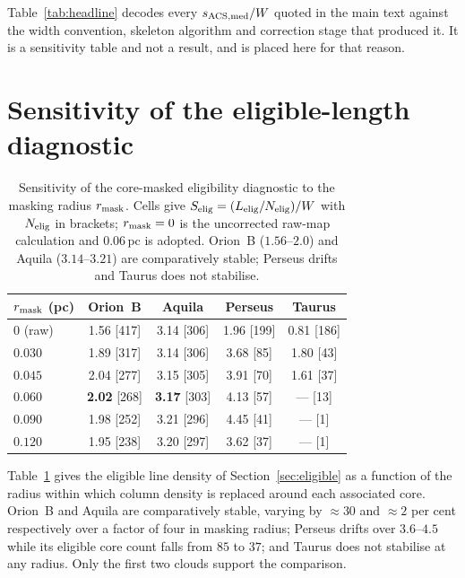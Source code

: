 \documentclass[usenatbib,twoside,twocolumn]{mnras}
\begin{document}
Table~\ref{tab:headline} decodes every $s_{\rm ACS,med}/W$ quoted in the main text against the width convention, skeleton algorithm and correction stage that produced it. It is a sensitivity table  and not a result, and is placed here for that reason.

\section{Sensitivity of the eligible-length diagnostic}
\label{sec:maskapp}

\begin{table}
\caption{Sensitivity of the core-masked eligibility diagnostic to the masking radius $r_{\rm mask}$. Cells give $S_{\rm elig}=(L_{\rm elig}/N_{\rm elig})/W$ with $N_{\rm elig}$ in brackets; $r_{\rm mask}=0$ is the uncorrected raw-map calculation and $0.06$\,pc is adopted. Orion~B ($1.56$--$2.0$) and Aquila ($3.14$--$3.21$) are comparatively stable; Perseus drifts and Taurus does not stabilise.}
\label{tab:maskrad}
\footnotesize
\setlength{\tabcolsep}{4pt}
\begin{tabular}{lcccc}
\toprule
$r_{\rm mask}$ (pc) & Orion~B & Aquila & Perseus & Taurus \\
\midrule
$0$ (raw) & 1.56 [417] & 3.14 [306] & 1.96 [199] & 0.81 [186] \\
$0.030$   & 1.89 [317] & 3.14 [306] & 3.68 [85]  & 1.80 [43] \\
$0.045$   & 2.04 [277] & 3.15 [305] & 3.91 [70]  & 1.61 [37] \\
$0.060$   & \textbf{2.02} [268] & \textbf{3.17} [303] & 4.13 [57] & --- [13] \\
$0.090$   & 1.98 [252] & 3.21 [296] & 4.45 [41]  & --- [1] \\
$0.120$   & 1.95 [238] & 3.20 [297] & 3.62 [37]  & --- [1] \\
\bottomrule
\end{tabular}
\end{table}

Table~\ref{tab:maskrad} gives the eligible line density of Section~\ref{sec:eligible} as a function of the radius within which column density is replaced around each associated core. Orion~B and Aquila are comparatively stable, varying by $\approx30$ and $\approx2$ per cent respectively over a factor of four in masking radius; Perseus drifts over $3.6$--$4.5$ while its eligible core count falls from $85$ to $37$; and Taurus does not stabilise at any radius. Only the first two clouds support the comparison.
\end{document}

